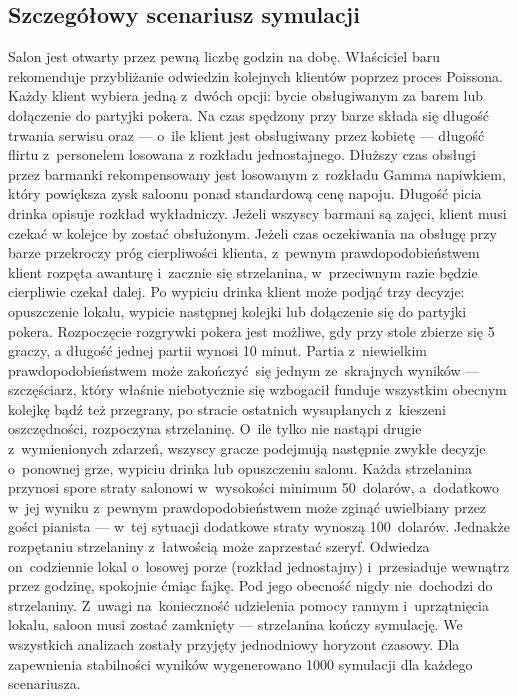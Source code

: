 \documentclass[12pt, a4paper, oneside]{mwart} %
\begin{document}
\subsection{Szczegółowy scenariusz symulacji}
Salon jest otwarty przez pewną liczbę godzin na dobę. Właściciel baru rekomenduje przybliżanie odwiedzin kolejnych klientów poprzez proces Poissona. Każdy klient wybiera jedną z~dwóch opcji: bycie obsługiwanym za barem lub dołączenie do partyjki pokera. Na czas spędzony przy barze składa się długość trwania serwisu oraz --- o~ile klient jest obsługiwany przez kobietę --- długość flirtu z~personelem losowana z rozkładu jednostajnego. Dłuższy czas obsługi przez barmanki rekompensowany jest losowanym z~rozkładu Gamma napiwkiem, który powiększa zysk saloonu ponad standardową cenę napoju. Długość picia drinka opisuje rozkład wykładniczy. Jeżeli wszyscy barmani są zajęci, klient musi czekać w kolejce by zostać obsłużonym. Jeżeli czas oczekiwania na obsługę przy barze przekroczy próg cierpliwości klienta, z~pewnym prawdopodobieństwem klient rozpęta awanturę i~zacznie się strzelanina, w~przeciwnym razie będzie cierpliwie czekał dalej. Po wypiciu drinka klient może podjąć trzy decyzje: opuszczenie lokalu, wypicie następnej kolejki lub dołączenie się do partyjki pokera. Rozpoczęcie rozgrywki pokera jest możliwe, gdy przy stole zbierze się 5 graczy, a długość jednej partii wynosi 10 minut. Partia z~niewielkim prawdopodobieństwem może zakończyć~się jednym ze~skrajnych wyników --- szczęściarz, który właśnie niebotycznie się wzbogacił funduje wszystkim obecnym kolejkę bądź też przegrany, po stracie ostatnich wysupłanych z~kieszeni oszczędności, rozpoczyna strzelaninę. O~ile tylko nie nastąpi drugie z~wymienionych zdarzeń, wszyscy gracze podejmują następnie zwykłe decyzje o~ponownej grze, wypiciu drinka lub opuszczeniu salonu. Każda strzelanina przynosi spore straty salonowi w~wysokości minimum 50~dolarów, a~dodatkowo w~jej wyniku z~pewnym prawdopodobieństwem może zginąć uwielbiany przez gości pianista --- w~tej sytuacji dodatkowe straty wynoszą 100~dolarów. Jednakże rozpętaniu strzelaniny z~łatwością może zaprzestać szeryf. Odwiedza on~codziennie lokal o~losowej porze (rozkład jednostajny) i~przesiaduje wewnątrz przez godzinę, spokojnie ćmiąc fajkę. Pod jego obecność nigdy nie~dochodzi do strzelaniny. Z~uwagi na~konieczność udzielenia pomocy rannym i~uprzątnięcia lokalu, saloon musi zostać zamknięty --- strzelanina kończy symulację. We wszystkich analizach zostały przyjęty jednodniowy horyzont czasowy. Dla zapewnienia stabilności wyników wygenerowano 1000 symulacji dla każdego scenariusza.
\end{document}
